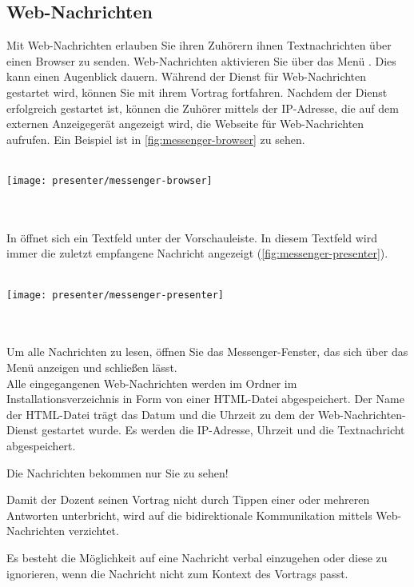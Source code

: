 \subsection{Web-Nachrichten}
\label{section:web-messages}
Mit Web-Nachrichten erlauben Sie ihren Zuhörern ihnen Textnachrichten über einen Browser zu senden. Web-Nachrichten aktivieren Sie über das Menü . Dies kann einen Augenblick dauern. Während der Dienst für Web-Nachrichten gestartet wird, können Sie mit ihrem Vortrag fortfahren. Nachdem der Dienst erfolgreich gestartet ist, können die Zuhörer mittels der IP-Adresse, die auf dem externen Anzeigegerät angezeigt wird, die Webseite für Web-Nachrichten aufrufen. Ein Beispiel ist in \autoref{fig:messenger-browser} zu sehen.
\\\\
\begin{minipage}{0.9\textwidth}
	\centering
	\captionsetup{type=figure}
	\texttt{[image: presenter/messenger-browser]}
  	\label{fig:messenger-browser}
\end{minipage}
\\\\
In \lectPresenter{} öffnet sich ein Textfeld unter der Vorschauleiste. In diesem Textfeld wird immer die zuletzt empfangene Nachricht angezeigt (\autoref{fig:messenger-presenter}).
\\\\
\begin{minipage}{0.9\textwidth}
	\centering
	\captionsetup{type=figure}
	\texttt{[image: presenter/messenger-presenter]}
  	\label{fig:messenger-presenter}
\end{minipage}
\\\\
Um alle Nachrichten zu lesen, öffnen Sie das Messenger-Fenster, das sich über das Menü  anzeigen und schließen lässt.
\\
Alle eingegangenen Web-Nachrichten werden im Ordner  im Installationsverzeichnis in Form von einer HTML-Datei abgespeichert. Der Name der HTML-Datei trägt das Datum und die Uhrzeit zu dem der Web-Nachrichten-Dienst gestartet wurde. Es werden die IP-Adresse, Uhrzeit und die Textnachricht abgespeichert.
\\
\begin{note}
	Die Nachrichten bekommen nur Sie zu sehen!
\end{note}
\begin{info}
	Damit der Dozent seinen Vortrag nicht durch Tippen einer oder mehreren Antworten unterbricht, wird auf die bidirektionale Kommunikation mittels Web-Nachrichten verzichtet.
	
	Es besteht die Möglichkeit auf eine Nachricht verbal einzugehen oder diese zu ignorieren, wenn die Nachricht nicht zum Kontext des Vortrags passt.
\end{info}


